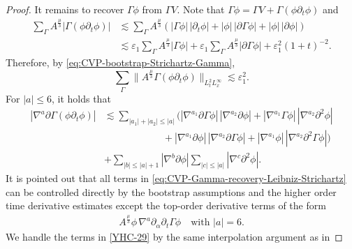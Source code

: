 \documentclass[11pt,twoside]{article}
\def\p{\partial}
\def\ve{\varepsilon}
\def\ls{\lesssim}
\theoremstyle{plain}
\theoremstyle{definition}
\theoremstyle{assumption}
\numberwithin{equation}{section}
\begin{document}
\begin{proof}
		It remains to recover \(\Gamma\phi\) from \(\Gamma V\). Note that
		$\Gamma\phi=\Gamma V+\Gamma(\phi\p_t\phi)$
		and
		\begin{equation}\label{eq:CVP-Gamma-zero-recovery-error-Strichartz}
			\begin{aligned}
				\sum_{\Gamma}
				A^{\frac{\mu}{3}}|\Gamma(\phi\p_t\phi)|
				&\ls\sum_{\Gamma}
				A^{\frac{\mu}{3}}
				\left(|\Gamma\phi|\,|\p_t\phi|
				+|\phi|\,|\p\Gamma\phi|
				+|\phi|\,|\p\phi|
				\right)\\
				&\ls\ve_1
				\sum_{\Gamma}
				A^{\frac{\mu}{3}}|\Gamma\phi|
				+\ve_1\sum_{\Gamma}
				A^{\frac{\mu}{3}}|\p\Gamma\phi|
				+\ve_1^2(1+t)^{-2}.
			\end{aligned}
		\end{equation}
		Therefore, by \eqref{eq:CVP-bootstrap-Strichartz-Gamma},
		\begin{equation}
			\label{GM-1}
			\sum_{\Gamma}
			\big\|
			A^{\frac{\mu}{3}}\Gamma(\phi\p_t\phi)
			\big\|_{L^2_{t}L^\infty_x}
			\ls
			\ve_1^2.
		\end{equation}
		For \(|a|\le 6\), it holds that
		\begin{equation}
			\label{eq:CVP-Gamma-recovery-Leibniz-Strichartz}
			\begin{aligned}
				|\nabla^a\p\Gamma(\phi\p_t\phi)|
				&\ls
				\sum_{|a_1|+|a_2|\le |a|}
				\big(|\nabla^{a_1}\p\Gamma\phi|\,
				|\nabla^{a_2}\p\phi|
				+|\nabla^{a_1}\Gamma\phi|\,
				|\nabla^{a_2}\p^2\phi|\\
				&\qquad\qquad\qquad+
				|\nabla^{a_1}\p\phi|\,
				|\nabla^{a_2}\p\Gamma\phi|
				+|\nabla^{a_1}\phi|\,
				|\nabla^{a_2}\p^2\Gamma\phi|
				\big)\\
				&+\sum_{|b|\le |a|+1}
				|\nabla^b\p\phi|
				\sum_{|c|\le |a|}
				|\nabla^c\p^2\phi|.
			\end{aligned}
		\end{equation}
		It is pointed out that all terms in \eqref{eq:CVP-Gamma-recovery-Leibniz-Strichartz} can be
		controlled directly by the bootstrap assumptions and the higher order time
		derivative estimates except the top-order derivative terms of the form
		\begin{equation}\label{YHC-29}
			\begin{aligned}
		A^{\frac{\mu}{3}}
		\phi\,\nabla^a\p_\alpha\p_t\Gamma\phi
		\quad\text{with $|a|=6$.}
		\end{aligned}
		\end{equation}
		We handle the terms in \eqref{YHC-29} by the same interpolation argument as in

\end{proof}
\end{document}
